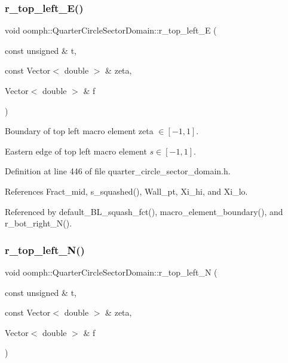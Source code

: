 \subsubsection{\texorpdfstring{r\+\_\+top\+\_\+left\+\_\+\+E()}{r\_top\_left\_E()}}
{\footnotesize\ttfamily void oomph\+::\+Quarter\+Circle\+Sector\+Domain\+::r\+\_\+top\+\_\+left\+\_\+E (\begin{DoxyParamCaption}\item[{const unsigned \&}]{t,  }\item[{const Vector$<$ double $>$ \&}]{zeta,  }\item[{Vector$<$ double $>$ \&}]{f }\end{DoxyParamCaption})\hspace{0.3cm}{\ttfamily [private]}}



Boundary of top left macro element zeta $ \in [-1,1] $. 

Eastern edge of top left macro element $ s \in [-1,1] $. 

Definition at line 446 of file quarter\+\_\+circle\+\_\+sector\+\_\+domain.\+h.



References Fract\+\_\+mid, s\+\_\+squashed(), Wall\+\_\+pt, Xi\+\_\+hi, and Xi\+\_\+lo.



Referenced by default\+\_\+\+B\+L\+\_\+squash\+\_\+fct(), macro\+\_\+element\+\_\+boundary(), and r\+\_\+bot\+\_\+right\+\_\+\+N().

\mbox{\label{classoomph_1_1QuarterCircleSectorDomain_af1520e712b46c8e1b0f098596fa63101}} 
\subsubsection{\texorpdfstring{r\+\_\+top\+\_\+left\+\_\+\+N()}{r\_top\_left\_N()}}
{\footnotesize\ttfamily void oomph\+::\+Quarter\+Circle\+Sector\+Domain\+::r\+\_\+top\+\_\+left\+\_\+N (\begin{DoxyParamCaption}\item[{const unsigned \&}]{t,  }\item[{const Vector$<$ double $>$ \&}]{zeta,  }\item[{Vector$<$ double $>$ \&}]{f }\end{DoxyParamCaption})\hspace{0.3cm}{\ttfamily [private]}}



